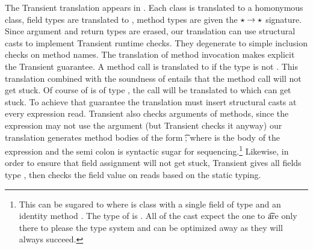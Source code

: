 \documentclass[acmsmall, anonymous, authordraft, review]{acmart} %
\begin{document}
The Transient translation appears in . Each class is translated
to a homonymous \kafka class, field types are translated to \any, method
types are given the $\star \to \star$ signature. Since argument and return
types are erased, our translation can use structural casts to implement
Transient runtime checks. They degenerate to simple inclusion checks on
method names.  The translation of method invocation makes explicit the
Transient guarantee.  A method call \Call\e\m\ep is translated to
\KCall\e\m\ep\any\any if the type \e is not \any. This translation combined
with the soundness of \kafka entails that the method call will not get
stuck.  Of course of \e is of type \any, the call will be translated to
\DynCall\e\m\ep which can get stuck.  To achieve that guarantee the
translation must insert structural casts at every expression read. Transient
also checks arguments of methods, since the expression may not use the
argument (but Transient checks it anyway) our translation generates method
bodies of the form \SubCast\t\x; \e where \e is the body of the expression
and the semi colon is syntactic sugar for sequencing.\footnote{This can be
  sugared to
  \SubCast\tp{\KCall{\New\A{\SubCast\any{\SubCast\t\x}}}\m{\SubCast\any\e}\any\any}
  where \A is class with a single field of type \any and an identity method
  \m. The type of \e is \tp. All of the cast expect the one to \t are only
  there to please the type system and can be optimized away as they will
  always succeed. } Likewise, in order to ensure that field assignment will
not get stuck, Transient gives all fields type \any, then checks the field
value on reads based on the static typing.
\end{document}
